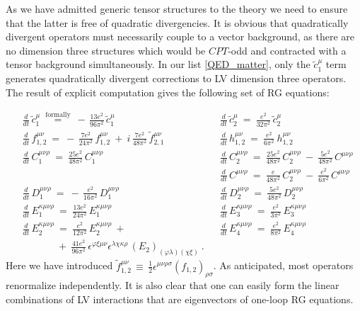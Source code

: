 \documentclass[12pt,preprintnumbers,nofootinbib]{revtex4}
\newcommand{\wt}{\widetilde}
\begin{document}
	As we have admitted generic tensor structures to the theory
	we need to ensure that the latter is free of quadratic divergencies.
	It is obvious that quadratically divergent operators must necessarily
	couple to a vector background, as there are no dimension
	three structures which would be $CPT$-odd and contracted with a tensor
	background simultaneously. 
	In our list \eqref{QED_matter}, only the $ \wt{c}_1^\mu $ term generates 
quadratically divergent corrections to LV dimension three operators. The result 
of explicit computation gives the following set of RG equations:

\begin{align*}
	&
	\frac{d} {d t}\, \wt{c}_1^\mu ~\overset{\text{formally}}{=}~
		-\, \frac{13e^2}{96\pi^2}\, \wt{c}_1^\mu
	&&
	\frac{d} {d t}\, \wt{c}_2^\mu ~=~
		\frac{e^2}{32\pi^2}\, \wt{c}_2^\mu
	\\
	&
	\frac{d} {d t}\, f_{1,2}^{\mu\nu} ~=~
		-\, \frac{7e^2}{24\pi^2}\, f_{1,2}^{\mu\nu}
		~+~
		i\, \frac{7e^2}{48\pi^2}\, \wt{f}{}_{2,1}^{\mu\nu}
	&&
	\frac{d} {d t}\, h_{1,2}^{\mu\nu} ~=~
		\frac{e^2}{6\pi^2}\ h_{1,2}^{\mu\nu} 
	\\
	&
	\frac{d} {d t}\, C_1^{\mu\nu\rho} ~=~
		\frac{25e^2}{48\pi^2}\, C_1^{\mu\nu\rho}
	&&
	\frac{d} {d t}\, C_2^{\mu\nu\rho} ~=~
		\frac{25e^2}{48\pi^2}\, C_2^{\mu\nu\rho}
		~-~
		\frac{5e^2}{48\pi^2}\, C^{\mu\nu\rho}
	\\
	&&&
	\frac{d} {d t}\, C^{\mu\nu\rho} ~=~
		\frac{e}{48\pi^2}\, C_2^{\mu\nu\rho} 
		~-~
		\frac{e^2}{6\pi^2}\, C^{\mu\nu\rho}
	\\
	&
	\frac{d} {d t}\, D_1^{\mu\nu\rho} ~=~
		-\, \frac{e^2}{16\pi^2}\, D_1^{\mu\nu\rho}
	&&
	\frac{d} {d t}\, D_2^{\mu\nu\rho} ~=~
		\frac{5e^2}{48\pi^2}\, D_2^{\mu\nu\rho}
	\\
	&
	\frac{d} {d t}\, E_1^{\kappa\mu\nu\rho} ~=~
		\frac{13e^2}{24\pi^2}\, E_1^{\kappa\mu\nu\rho}
	&&
	\frac{d} {d t}\, E_3^{\kappa\mu\nu\rho} ~=~
		\frac{e^2}{3\pi^2}\, E_3^{\kappa\mu\nu\rho}
	\\
	&
	\frac{d} {d t}\, E_2^{\kappa\mu\nu\rho} ~=~
		\frac{e^2}{12\pi^2}\, E_2^{\kappa\mu\nu\rho}
		~+~      
	&&
	\frac{d} {d t}\, E_4^{\kappa\mu\nu\rho} ~=~
		\frac{e^2}{8\pi^2}\, E_4^{\kappa\mu\nu\rho}
	\\
	&
	\phantom{\frac{d} {d t}\, E_2^{\kappa\mu\nu\rho}}
		~+~ \frac{41e^2}{96\pi^2}\,
		\epsilon^{\varphi\xi\mu\nu} 
		\epsilon^{\lambda\chi\kappa\rho}\,
		(E_2)_{(\varphi\lambda)(\chi\xi)}
	~.
\end{align*}	
	Here we have introduced $ \wt{f}{}_{1,2}^{\mu\nu} \,\equiv\, \frac{1}{2} 
		\epsilon^{\mu\nu\rho\sigma} (f_{1,2})_{\rho\sigma} $.
	As anticipated, most operators renormalize independently.
	It is also clear that one can easily form the linear combinations
	of LV interactions that are eigenvectors of one-loop RG equations.
\end{document}
